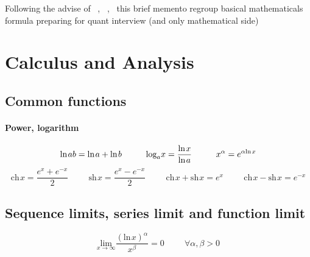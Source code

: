 \documentclass[a4paper,10pt]{article}
\newcommand{\fnc}[2]{%
  \text{#1}\hspace{1pt} #2
}
\begin{document}
\begin{center}\end{center}
Following the advise of ~\cite{michael2004}, ~\cite{PDGuide},~\cite{advise} this brief memento regroup basical mathematicals formula preparing for quant interview (and only mathematical side)
\section{Calculus and Analysis}
\subsection{Common functions}
\paragraph{Power, logarithm}
\[
\fnc{ln}{ab}=\fnc{ln}{a}+\fnc{ln}{b} \hspace{1cm} \text{log}_{a}x=\frac{\fnc{ln}{x}}{\fnc{ln}{a}} \hspace{1cm} x^{\alpha} = e^{\alpha \fnc{ln}{x}}
\]
\[
\fnc{ch}{x} = \frac{e^x + e^{-x}}{2} \hspace{1cm} \fnc{sh}{x} = \frac{e^x - e^{-x}}{2} \hspace{1cm} \fnc{ch}{x}+\fnc{sh}{x} = e^x \hspace{1cm} \fnc{ch}{x}-\fnc{sh}{x}=e^{-x}
\]
\subsection{Sequence limits, series limit and function limit}
\[
\underset{x\rightarrow \infty}{\text{lim}} \frac{(\fnc{ln}{x})^{\alpha}}{x^{\beta}}=0 \hspace{1cm} \forall \alpha,\beta > 0
\]
\end{document}
